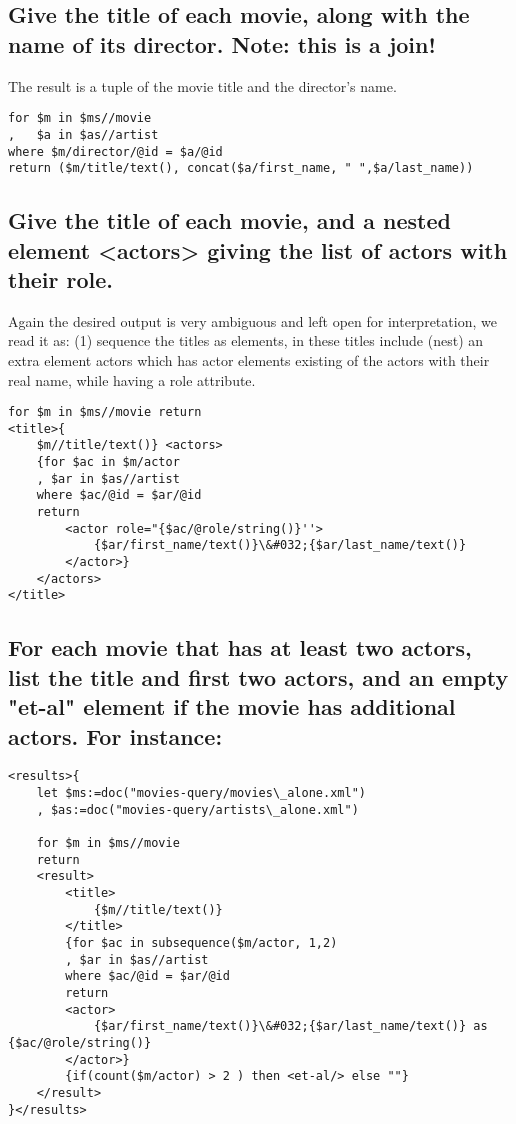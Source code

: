 \documentclass{article}
\begin{document}
\subsection{ Give the title of each movie, along with the name of its
  director. Note: this is a join!}
The result is a tuple of the movie title and the director's name.
\begin{verbatim}
for $m in $ms//movie
,   $a in $as//artist
where $m/director/@id = $a/@id  
return ($m/title/text(), concat($a/first_name, " ",$a/last_name))
\end{verbatim}
\subsection{ Give the title of each movie, and a nested element
  <actors> giving the list of actors with their role.  }

Again the desired output is very ambiguous and left open for
interpretation, we read it as: (1) sequence the titles as elements, in
these titles include (nest) an extra element actors which has actor
elements existing of the actors with their real name, while having a
role attribute.

\begin{verbatim}
for $m in $ms//movie return 
<title>{                                                                                                                  
    $m//title/text()} <actors>
    {for $ac in $m/actor
    , $ar in $as//artist 
    where $ac/@id = $ar/@id 
    return 
        <actor role="{$ac/@role/string()}''>                                                                                                                          
            {$ar/first_name/text()}\&#032;{$ar/last_name/text()}         
        </actor>} 
    </actors>
</title>

\end{verbatim}
\subsection{ For each movie that has at least two actors, list the
  title and first two actors, and an empty "et-al" element if the
  movie has additional actors. For instance: }
\begin{verbatim}
<results>{
    let $ms:=doc("movies-query/movies\_alone.xml")
    , $as:=doc("movies-query/artists\_alone.xml")
    
    for $m in $ms//movie
    return
    <result>
        <title>
            {$m//title/text()}             
        </title>
        {for $ac in subsequence($m/actor, 1,2)
        , $ar in $as//artist 
        where $ac/@id = $ar/@id 
        return 
        <actor>                                                                                                                          
            {$ar/first_name/text()}\&#032;{$ar/last_name/text()} as  {$ac/@role/string()}
        </actor>}
        {if(count($m/actor) > 2 ) then <et-al/> else ""}
    </result>
}</results>
\end{verbatim}
\end{document}
